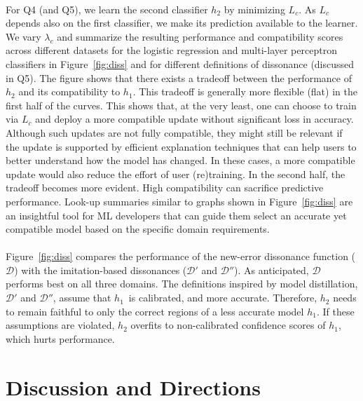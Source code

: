 \documentclass[letterpaper]{article}
\newcommand{\hone}{\mbox{$h_1$}}
\newcommand{\htwo}{\mbox{$h_2$}}
\newcommand{\loss}{L}
\newcommand{\lossbc}{\loss_c}
\newcommand{\lambdabc}{\lambda_c}
\newcommand{\dissonance}{\mathcal{D}}
\begin{document}
\\
\noindent For Q4 (and Q5), we learn the second classifier $\htwo$ by minimizing $\lossbc$. As $\lossbc$ depends also on the first classifier, we make its prediction available to the learner. We vary $\lambdabc$ and summarize the resulting performance and compatibility scores across different datasets for the logistic regression and multi-layer perceptron classifiers in Figure~\ref{fig:diss} and for different definitions of dissonance (discussed in Q5). 
The figure shows that there exists a tradeoff between the performance of $\htwo$ and its compatibility to $\hone$. This tradeoff is generally more flexible (flat) in the first half of the curves. This shows that, at the very least, one can choose to train via $\lossbc$ and deploy a more compatible update without significant loss in accuracy. Although such updates are not fully compatible, they might still be relevant if the update is supported by efficient explanation techniques that can help users to better understand how the model has changed. In these cases, a more compatible update would also reduce the effort of user (re)training. In the second half, the tradeoff becomes more evident. High compatibility can sacrifice predictive performance. Look-up summaries similar to graphs shown in Figure~\ref{fig:diss} are an insightful tool for ML developers that can guide them select an accurate yet compatible model based on the specific domain requirements. \\

\\
 Figure~\ref{fig:diss} compares the performance of the new-error dissonance function ($\dissonance$) with the imitation-based dissonances ($\dissonance'$  and  $\dissonance''$). As anticipated, $\dissonance$ performs  best on all  three domains. The definitions inspired by model distillation, $\dissonance'$ and $\dissonance''$,  assume that \hone\ is calibrated, and more accurate. Therefore, $\htwo$ needs to remain faithful to only the correct regions of a less accurate model $\hone$. If these assumptions are violated, $\htwo$ overfits to non-calibrated confidence scores of $\hone$, which hurts performance.


\section{Discussion and Directions}
\end{document}
